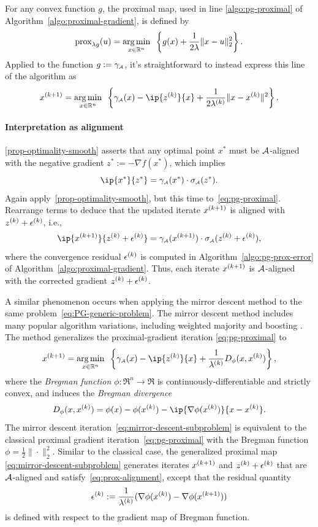 For any convex function $g$, the proximal map, used in
line \ref{algo:pg-proximal} of Algorithm~\ref{algo:proximal-gradient}, is defined by
\begin{equation*}
   \operatorname{prox}_{\lambda g}(u) = \underset{x\in\mathbb{R}^n}{\textrm{arg}\,{\min}}\enskip \left\{ g(x) + \frac{1}{2\lambda}\|x-u\|_2^2 \right\}.
\end{equation*}
Applied to the function $g:=\gamma_{\scriptscriptstyle\mathcal{A}}$, it's straightforward to instead express
this line of the algorithm as
\begin{equation} \label{eq:pg-proximal}
  x\kp1 = \argmin{x \in \Re^n}
  \left\{ \gauge\As(x) - \ip{z\k}{x} + \frac{1}{2\lambda\k}\|x - x\k\|^2 \right\}.
\end{equation}
 \paragraph{Interpretation as alignment} \autoref{prop-optimality-smooth} asserts
 that any optimal point $x^*$ must be
 $\mathcal{A}$-aligned with the negative gradient $z^*:=-\nabla f(x^*)$, which implies
\[
  \ip{x^*}{z^*} = \gauge\As(x^*)\cdot\sigma\As(z^*).
\]
Again apply~\autoref{prop-optimality-smooth}, but this time
to~\eqref{eq:pg-proximal}. Rearrange terms to deduce that the updated iterate
$x^{(k+1)}$ is aligned with $z^{(k)}+\epsilon^{(k)}$, i.e.,
\begin{equation} \label{eq:prox-alignment}
  \ip{x\kp1}{z\k + \epsilon\k} = \gauge\As(x\kp1)\cdot\sigma\As(z\k+\epsilon\k),
\end{equation}
where the convergence residual $\epsilon^{(k)}$ is computed in
Algorithm~\ref{algo:pg-prox-error} of Algorithm~\ref{algo:proximal-gradient}. Thus, each iterate
$x^{(k+1)}$ is $\mathcal{A}$-aligned with the corrected gradient $z^{(k)}+\epsilon^{(k)}$.

A similar phenomenon occurs when applying the mirror descent method
\cite{nemirovsky1983problem,beck2003mirror} to the same
problem~\eqref{eq:PG-generic-problem}. The mirror descent method includes many
popular algorithm variations, including weighted majority
\cite{littlestone1994weighted} and boosting \cite{freund1999short}. The method
generalizes the proximal-gradient iteration \eqref{eq:pg-proximal} to
\begin{equation} \label{eq:mirror-descent-subproblem}
  x\kp1 = \argmin{x \in \Re^n} \left\{ \gauge\As(x) - \ip{z\k}{x} + \frac{1}{\lambda\k}D_\phi(x, x\k) \right\},  
\end{equation}
where the \emph{Bregman function} $\phi:\Re^n\to\Re$ is
continuously-differentiable and strictly convex, and induces the
\emph{Bregman divergence} 
\[
  D_\phi(x, x\k) = \phi(x) - \phi(x\k) - \ip{\nabla\phi(x\k)}{x - x\k}.
\]
The mirror descent iteration~\eqref{eq:mirror-descent-subproblem} is equivalent
to the classical proximal gradient iteration~\eqref{eq:pg-proximal} with the
Bregman function $\phi = \frac{1}{2}\|\cdot\|_2^2$.  Similar to the classical
case, the generalized proximal map \eqref{eq:mirror-descent-subproblem}
generates iterates $x^{(k+1)}$ and $z^{(k)}+\epsilon^{(k)}$ that are $\mathcal{A}$-aligned and
satisfy~\eqref{eq:prox-alignment}, except that the residual quantity
\[
\epsilon^{(k)} := \frac{1}{\lambda^{(k)}}(\nabla \phi(x^{(k)}) - \nabla \phi(x^{(k+1)}))
\]
is defined with respect to the gradient map of Bregman function.


